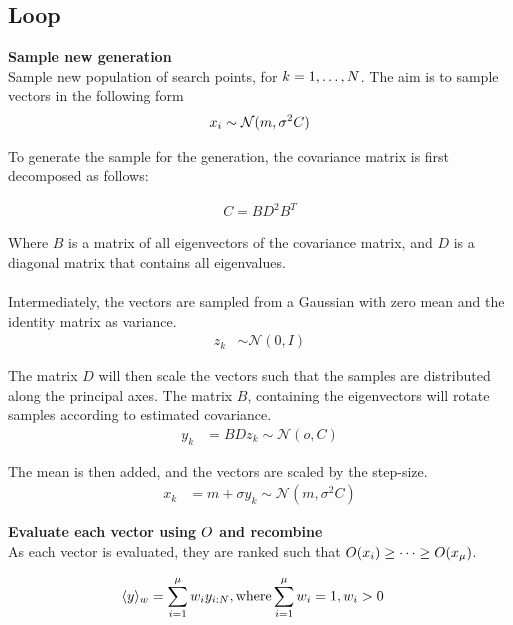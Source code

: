 \subsection{Loop}

\textbf{Sample new generation}\\
Sample new population of search points, for $k = 1, \dots, N$.
The aim is to sample vectors in the following form
\begin{align*}
x_{i} \sim \mathcal{N}(m, \sigma^2 C)
\end{align*}


To generate the sample for the generation, the covariance matrix is first 
decomposed as follows:

\begin{align*}
C = B D^2 B^{T}
\end{align*}

Where $B$ is a matrix of all eigenvectors of the covariance matrix, and  $D$
is a diagonal matrix that contains all eigenvalues.\\
\\
Intermediately, the vectors are sampled from a Gaussian with zero mean and
the identity matrix as variance.
\begin{align*}
z_{k} &\sim \mathcal{N}(0, I)
\end{align*}

The matrix $D$ will then scale the vectors such that the samples
are distributed along the principal axes. The matrix $B$, containing 
the eigenvectors will rotate samples according to estimated covariance.
\begin{align*}
y_{k} &= BDz_{k} \sim \mathcal{N}(o, C)
\end{align*}

The mean is then added, and the vectors are scaled by the step-size.
\begin{align*}
x_{k} &= m + \sigma y_{k} \sim \mathcal{N}(m, \sigma^2 C)
\end{align*}



\textbf{Evaluate each vector using $O$ and recombine}\\
As each vector is evaluated, they are ranked such that 
$O{ \left( x_{i} \right) } \geq \dots \geq O{ \left( x_{\mu} \right)}$.

\begin{align*}
\langle y \rangle_{w} &= \sum^{\mu}_{i = 1}w_{i} y_{i : N}, \text{where} \sum^{\mu}_{i = 1} w_{i} = 1, w_{i} > 0
\end{align*}

